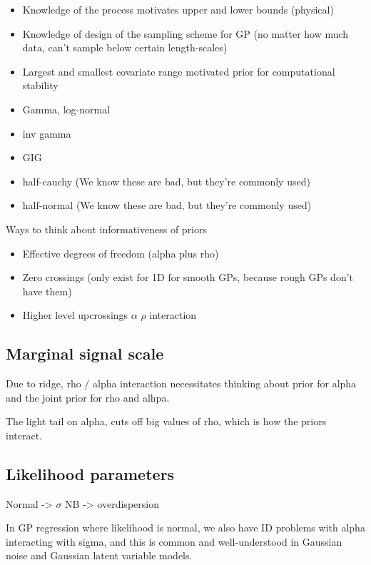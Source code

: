\documentclass{article}
\begin{document}
\begin{itemize}
  \item Knowledge of the process motivates upper and lower bounds (physical)
  \item Knowledge of design of the sampling scheme for GP (no matter how much data, can't sample below certain length-scales)
  \item Largest and smallest covariate range motivated prior for computational stability
\end{itemize}

\begin{itemize}
  \item Gamma, log-normal
  \item inv gamma
  \item GIG
  \item half-cauchy (We know these are bad, but they're commonly used)
  \item half-normal (We know these are bad, but they're commonly used)
\end{itemize}

Ways to think about informativeness of priors

\begin{itemize}
  \item Effective degrees of freedom (alpha plus rho)
  \item Zero crossings (only exist for 1D for smooth GPs, because rough GPs
    don't have them) 
  \item Higher level upcrossings $\alpha$ $\rho$ interaction
\end{itemize}

\subsection{Marginal signal scale}

Due to ridge, rho / alpha interaction necessitates thinking about prior
for alpha and the joint prior for rho and alhpa.

The light tail on alpha, cuts off big values of rho, which is how the 
priors interact.

\subsection{Likelihood parameters}

Normal -> $\sigma$
NB -> overdispersion

In GP regression where likelihood is normal, we also have ID problems
with alpha interacting with sigma, and this is common and well-understood
in Gaussian noise and Gaussian latent variable models.
\end{document}
